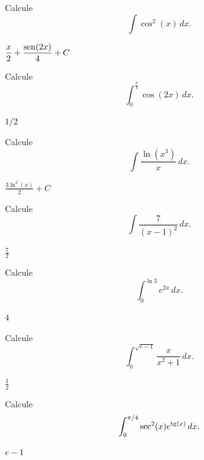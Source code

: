 \begin{exer}
  Calcule
  \begin{equation}
    \int \cos^2(x)\,dx.
  \end{equation}
\end{exer}
\begin{resp}
  $\displaystyle \frac{x}{2} + \frac{\operatorname{sen}(2x)}{4} + C$
\end{resp}

\begin{exer}
  Calcule
  \begin{equation}
    \int_0^{\frac{\pi}{4}}\cos(2x)\,dx.
  \end{equation}
\end{exer}
\begin{resp}
  $1/2$
\end{resp}

\begin{exer}
  Calcule
  \begin{equation}
    \int \frac{\ln(x^3)}{x}\,dx.
  \end{equation}
\end{exer}
\begin{resp}
  $\displaystyle \frac{3\ln^2(x)}{2} + C$
\end{resp}

\begin{exer}
  Calcule
  \begin{equation}
    \int \frac{7}{(x-1)^2}\,dx.
  \end{equation}
\end{exer}
\begin{resp}
  $\frac{7}{2}$
\end{resp}

\begin{exer}
  Calcule
  \begin{equation}
    \int_0^{\ln 3} e^{2x}\,dx.
  \end{equation}
\end{exer}
\begin{resp}
  $4$
\end{resp}

\begin{exer}
  Calcule
  \begin{equation}
    \int_0^{\sqrt{e-1}} \frac{x}{x^2+1}\,dx.
  \end{equation}
\end{exer}
\begin{resp}
  $\frac{1}{2}$
\end{resp}

\begin{exer}
  Calcule
  \begin{equation}
    \int_0^{\pi/4} \sec^2(x)e^{\operatorname{tg}(x)}\,dx.
  \end{equation}
\end{exer}
\begin{resp}
  $e-1$
\end{resp}

